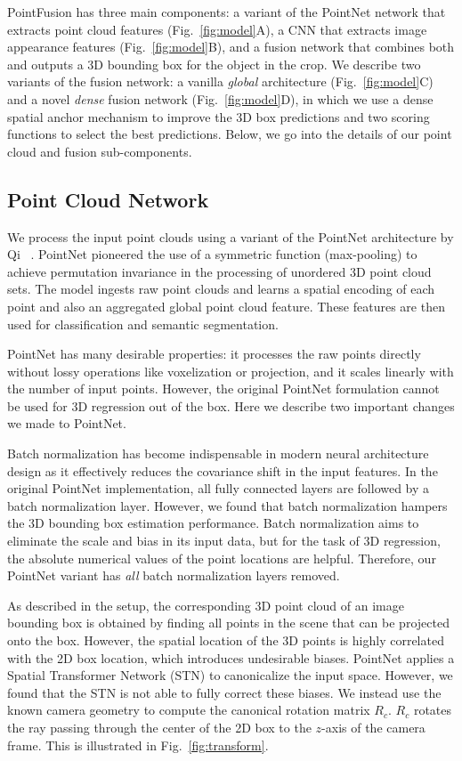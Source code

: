 \documentclass[10pt,twocolumn,letterpaper]{article}
\begin{document}
PointFusion has three main components: a variant of the PointNet network that extracts point cloud features (Fig.~\ref{fig:model}A), a CNN that extracts image appearance features (Fig.~\ref{fig:model}B), and a fusion network that combines both and outputs a 3D bounding box for the object in the crop. We describe two variants of the fusion network: a vanilla \textit{global} architecture (Fig.~\ref{fig:model}C) and a novel \textit{dense} fusion network (Fig.~\ref{fig:model}D), in which we use a dense spatial anchor mechanism to improve the 3D box predictions and two scoring functions to select the best predictions. Below, we go into the details of our point cloud and fusion sub-components. 

\subsection{Point Cloud Network}
We process the input point clouds using a variant of the PointNet architecture by Qi \etal~\cite{qi2016pointnet}. 
PointNet pioneered the use of a symmetric function (max-pooling) to achieve permutation invariance in the processing of unordered 3D point cloud sets. The model ingests raw point clouds and learns a spatial encoding of each point and also an aggregated global point cloud feature. These features are then used for classification and semantic segmentation.

PointNet has many desirable properties: it processes the raw points directly without lossy operations like voxelization or projection, and it scales linearly with the number of input points. However, the original PointNet formulation cannot be used for 3D regression out of the box. Here we describe two important changes we made to PointNet.

 Batch normalization has become indispensable in modern neural architecture design as it effectively reduces the covariance shift in the input features. In the original PointNet implementation, all fully connected layers are followed by a batch normalization layer. However, we found that batch normalization hampers the 3D bounding box estimation performance. Batch normalization aims to eliminate the scale and bias in its input data, but for the task of 3D regression, the absolute numerical values of the point locations are helpful. Therefore, our PointNet variant has \textit{all} batch normalization layers removed.

 As described in the setup, the corresponding 3D point cloud of an image bounding box is obtained by finding all points in the scene that can be projected onto the box. However, the spatial location of the 3D points is highly correlated with the 2D box location, which introduces undesirable biases. PointNet applies a Spatial Transformer Network (STN) to canonicalize the input space. However, we found that the STN is not able to fully correct these biases. We instead use the known camera geometry to compute the canonical rotation matrix $R_c$. $R_c$ rotates the ray passing through the center of the 2D box to the $z$-axis of the camera frame. This is illustrated in Fig.~\ref{fig:transform}.
\end{document}
